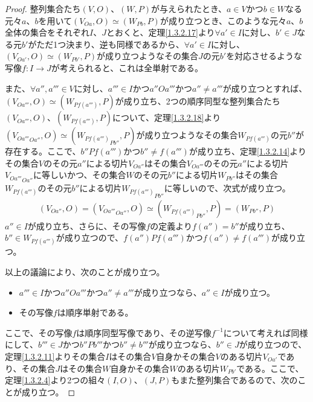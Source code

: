 \documentclass[dvipdfmx]{jsarticle}
\begin{document}
\begin{proof}
整列集合たち$(V,O)$、$(W,P)$が与えられたとき、$a \in V$かつ$b \in W$なる元々$a$、$b$を用いて$\left( V_{Oa},O \right) \simeq \left( W_{Pb},P \right)$が成り立つとき、このような元々$a$、$b$全体の集合をそれぞれ$I$、$J$とおくと、定理\ref{1.3.2.17}より$\forall a' \in I$に対し、$b' \in J$なる元$b'$がただ1つ決まり、逆も同様であるから、$\forall a' \in I$に対し、$\left( V_{Oa'},O \right) \simeq \left( W_{Pb'},P \right)$が成り立つようなその集合$J$の元$b'$を対応させるような写像$f:I \rightarrow J$が考えられると、これは全単射である。\par
また、$\forall a'',a''' \in V$に対し、$a''' \in I$かつ$a''Oa'''$かつ$a'' \neq a'''$が成り立つとすれば、$\left( V_{Oa'''},O \right) \simeq \left( W_{Pf\left( a''' \right)},P \right)$が成り立ち、2つの順序同型な整列集合たち$\left( V_{Oa'''},O \right)$、$\left( W_{Pf\left( a''' \right)},P \right)$について、定理\ref{1.3.2.18}より$\left( {V_{Oa'''}}_{Oa''},O \right) \simeq \left( {W_{Pf\left( a''' \right)}}_{Pb''},P \right)$が成り立つようなその集合$W_{Pf\left( a''' \right)}$の元$b''$が存在する。ここで、$b''Pf\left( a''' \right)$かつ$b'' \neq f\left( a''' \right)$が成り立ち、定理\ref{1.3.2.14}よりその集合$V$のその元$a''$による切片$V_{Oa''}$はその集合$V_{Oa'''}$のその元$a''$による切片${V_{Oa'''}}_{Oa''}$に等しいかつ、その集合$W$のその元$b''$による切片$W_{Pb''}$はその集合$W_{Pf\left( a''' \right)}$のその元$b''$による切片${W_{Pf\left( a''' \right)}}_{Pb''}$に等しいので、次式が成り立つ。
\begin{align*}
\left( V_{Oa''},O \right) = \left( {V_{Oa'''}}_{Oa''},O \right) \simeq \left( {W_{Pf\left( a''' \right)}}_{Pb''},P \right) = \left( W_{Pb''},P \right)
\end{align*}
$a'' \in I$が成り立ち、さらに、その写像$f$の定義より$f\left( a'' \right) = b''$が成り立ち、$b'' \in W_{Pf\left( a''' \right)}$が成り立つので、$f\left( a'' \right)Pf\left( a''' \right)$かつ$f\left( a'' \right) \neq f\left( a''' \right)$が成り立つ。\par
以上の議論により、次のことが成り立つ。
\begin{itemize}
\item
  $a''' \in I$かつ$a''Oa'''$かつ$a'' \neq a'''$が成り立つなら、$a'' \in I$が成り立つ。
\item
  その写像$f$は順序単射である。
\end{itemize}
ここで、その写像$f$は順序同型写像であり、その逆写像$f^{- 1}$について考えれば同様にして、$b''' \in J$かつ$b''Pb'''$かつ$b'' \neq b'''$が成り立つなら、$b'' \in J$が成り立つので、定理\ref{1.3.2.11}よりその集合$I$はその集合$V$自身かその集合$V$のある切片$V_{Oa'}$であり、その集合$J$はその集合$W$自身かその集合$W$のある切片$W_{Pb'}$である。ここで、定理\ref{1.3.2.4}より2つの組々$(I,O)$、$(J,P)$もまた整列集合であるので、次のことが成り立つ。

\end{proof}
\end{document}
